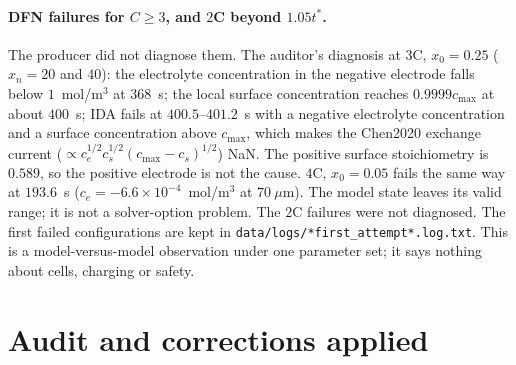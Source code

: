 \documentclass[10pt]{article}
\newcommand{\cmax}{c_{\max}}
\begin{document}
\paragraph{DFN failures for $C\ge3$, and $2$C beyond $1.05t^*$.} The producer did not diagnose them. The auditor's diagnosis at $3$C, $x_0=0.25$ ($x_n=20$ and $40$): the electrolyte concentration in the negative electrode falls below $1$~mol/m$^3$ at $368$~s; the local surface concentration reaches $0.9999\cmax$ at about $400$~s; IDA fails at $400.5$--$401.2$~s with a negative electrolyte concentration and a surface concentration above $\cmax$, which makes the Chen2020 exchange current ($\propto c_e^{1/2}c_s^{1/2}(\cmax-c_s)^{1/2}$) NaN. The positive surface stoichiometry is $0.589$, so the positive electrode is not the cause. $4$C, $x_0=0.05$ fails the same way at $193.6$~s ($c_e=-6.6\times10^{-4}$~mol/m$^3$ at $70~\mu$m). The model state leaves its valid range; it is not a solver-option problem. The $2$C failures were not diagnosed. The first failed configurations are kept in \texttt{data/logs/*first\_attempt*.log.txt}.
This is a model-versus-model observation under one parameter set; it says nothing about cells, charging or safety.

\section{Audit and corrections applied}\label{sec:corr}
\end{document}
